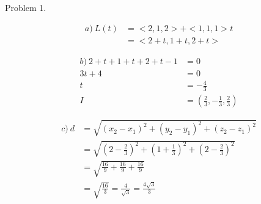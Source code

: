 \documentclass{article}
\begin{document}
\begin{text}
Problem 1.
\end{text}

\begin{align*}
a) \: L(t) &= < 2, 1, 2 > + < 1, 1, 1 >t \\
&= < 2 + t, 1 + t, 2 + t >
\end{align*}

\begin{align*}
b) \: 2 + t + 1 + t + 2 + t -1 &= 0 \\
3t + 4 &= 0 \\
t &= -\frac{4}{3} \\
I &= (\frac{2}{3}, -\frac{1}{3}, \frac{2}{3})
\end{align*}

\begin{align*}
c) \: d &= \sqrt{(x_2 - x_1)^2 + (y_2 - y_1)^2 + (z_2 - z_1)^2} \\
&= \sqrt{(2 - \frac{2}{3})^2 + (1 + \frac{1}{3})^2 + (2 - \frac{2}{3})^2} \\
&= \sqrt{\frac{16}{9} + \frac{16}{9} + \frac{16}{9}} \\
&= \sqrt{\frac{16}{3}} = \frac{4}{\sqrt{3}} = \frac{4\sqrt{3}}{3}
\end{align*}
\end{document}
